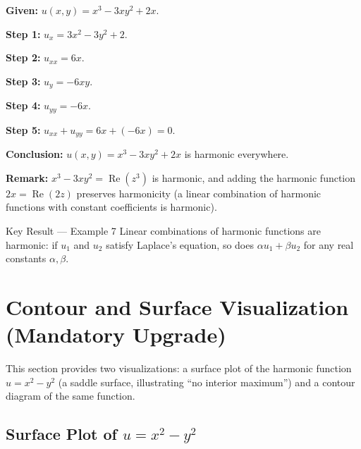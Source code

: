 \documentclass[12pt,a4paper]{article}
\begin{document}
\textbf{Given:} $u(x,y)=x^{3}-3xy^{2}+2x$.

\textbf{Step 1:} $u_{x} = 3x^{2}-3y^{2}+2$.

\textbf{Step 2:} $u_{xx} = 6x$.

\textbf{Step 3:} $u_{y} = -6xy$.

\textbf{Step 4:} $u_{yy} = -6x$.

\textbf{Step 5:} $u_{xx}+u_{yy} = 6x+(-6x) = 0$.

\textbf{Conclusion:} $u(x,y)=x^{3}-3xy^{2}+2x$ is harmonic everywhere.

\textbf{Remark:} $x^{3}-3xy^{2}=\operatorname{Re}(z^{3})$ is harmonic, and adding the
harmonic function $2x=\operatorname{Re}(2z)$ preserves harmonicity (a linear combination of
harmonic functions with constant coefficients is harmonic).

\begin{learnbox}{Key Result --- Example 7}
Linear combinations of harmonic functions are harmonic: if $u_{1}$ and $u_{2}$ satisfy
Laplace's equation, so does $\alpha u_{1}+\beta u_{2}$ for any real constants $\alpha,\beta$.
\end{learnbox}

\section{Contour and Surface Visualization (Mandatory Upgrade)}

This section provides two visualizations: a surface plot of the harmonic function
$u=x^{2}-y^{2}$ (a saddle surface, illustrating ``no interior maximum'') and a
contour diagram of the same function.

\subsection*{Surface Plot of $u = x^{2}-y^{2}$}

\begin{center}
\end{center}
\end{document}
